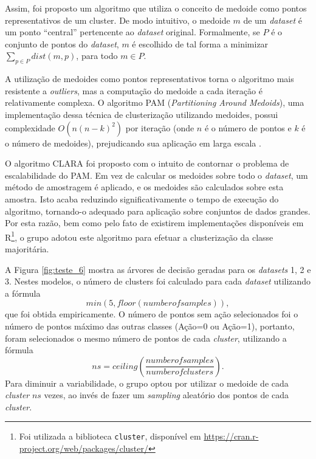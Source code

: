 Assim, foi proposto um algoritmo que utiliza o conceito de medoide como pontos representativos de um cluster. De modo intuitivo, o medoide $m$ de um \textit{dataset} é um ponto ``central'' pertencente ao \textit{dataset} original. Formalmente, se $P$ é o conjunto de pontos do \textit{dataset}, $m$ é escolhido de tal forma a minimizar $\sum_{p \in P}{dist(m,p)}$, para todo $m \in P$.

A utilização de medoides como pontos representativos torna o algoritmo mais resistente a \textit{outliers}, mas a computação do medoide a cada iteração é relativamente complexa. O algoritmo PAM (\textit{Partitioning Around Medoids}), uma implementação dessa técnica de clusterização utilizando medoides, possui complexidade $O\left(n(n-k)^2\right)$ por iteração (onde $n$ é o número de pontos e $k$ é o número de medoides), prejudicando sua aplicação em larga escala \cite{han2005}.

O algoritmo CLARA foi proposto com o intuito de contornar o problema de escalabilidade do PAM. Em vez de calcular os medoides sobre todo o \textit{dataset}, um método de amostragem é aplicado, e os medoides são calculados sobre esta amostra. Isto acaba reduzindo significativamente o tempo de execução do algoritmo, tornando-o adequado para aplicação sobre conjuntos de dados grandes. Por esta razão, bem como pelo fato de existirem implementações disponíveis em R\footnote{Foi utilizada a biblioteca \texttt{cluster}, disponível em \url{https://cran.r-project.org/web/packages/cluster/}}, o grupo adotou este algoritmo para efetuar a clusterização da classe majoritária.

A Figura \ref{fig:teste_6} mostra as árvores de decisão geradas para os \textit{datasets} 1, 2 e 3. Nestes modelos, o número de clusters foi calculado para cada \textit{dataset} utilizando a fórmula
\begin{equation*}
min(5, floor(number of samples)),
\end{equation*}
que foi obtida empiricamente. O número de pontos sem ação selecionados foi o número de pontos máximo das outras classes (Ação=0 ou Ação=1),
portanto, foram selecionados o mesmo número de pontos de cada \textit{cluster}, utilizando a fórmula
\begin{equation*}
ns = ceiling\left(\frac{number of samples}{number of clusters}\right).
\end{equation*}
Para diminuir a variabilidade, o grupo optou por utilizar o medoide de cada \textit{cluster} $ns$ vezes, ao invés de fazer um \textit{sampling} aleatório dos pontos de cada \textit{cluster}.

